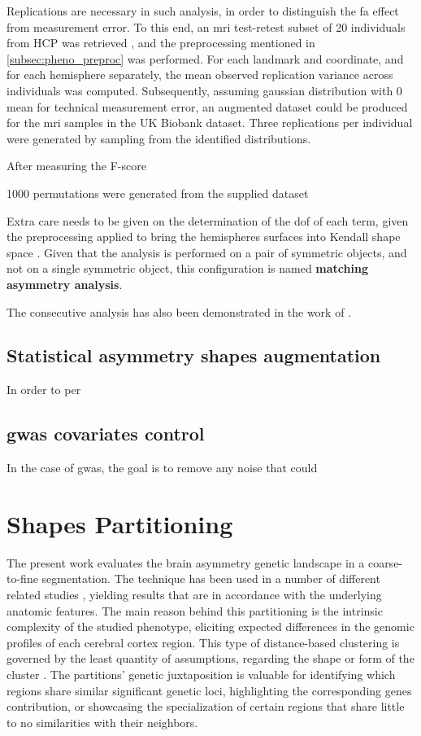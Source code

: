 Replications are necessary in such analysis, in order to distinguish the \ac{fa} effect from measurement error. To this end, an \ac{mri} test-retest subset of 20 individuals from HCP was retrieved \cite{VanEssen2013}, and the preprocessing mentioned in \autoref{subsec:pheno_preproc} was performed. For each landmark and coordinate, and for each hemisphere separately, the mean observed replication variance across individuals was computed. Subsequently, assuming gaussian distribution with 0 mean for technical measurement error, an augmented dataset could be produced for the \ac{mri} samples in the UK Biobank dataset. Three replications per individual were generated by sampling from the identified distributions.


After measuring the F-score

1000 permutations were generated from the supplied dataset


Extra care needs to be given on the determination of the \ac{dof} of each term, given the preprocessing applied to bring the hemispheres surfaces into Kendall shape space \cite{klingenberg2002}. Given that the analysis is performed on a pair of symmetric objects, and not on a single symmetric object, this configuration is named \textbf{matching asymmetry analysis}.


The consecutive analysis has also been demonstrated in the work of . 

\subsection{Statistical asymmetry shapes augmentation}
In order to per

\subsection{\ac{gwas} covariates control}
In the case of \ac{gwas}, the goal is to remove any noise that could

\section{Shapes Partitioning}
The present work evaluates the brain asymmetry genetic landscape in a coarse-to-fine segmentation. The technique has been used in a number of different related studies \cite{Claes2018}\cite{Naqvi2021}, yielding results that are in accordance with the underlying anatomic features. The main reason behind this partitioning is the intrinsic complexity of the studied phenotype, eliciting expected differences in the genomic profiles of each cerebral cortex region. This type of distance-based clustering is governed by the least quantity of assumptions, regarding the shape or form of the cluster \cite{VonLuxburg2007}. The partitions' genetic juxtaposition is valuable for identifying which regions share similar significant genetic loci, highlighting the corresponding genes contribution, or showcasing the specialization of certain regions that share little to no similarities with their neighbors.

